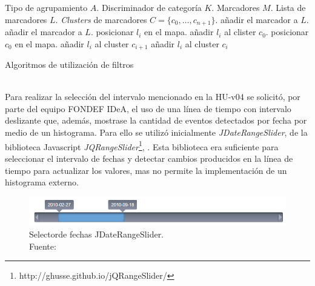 \begin{algorithm}[H]
	\begin{algorithmic}
		\REQUIRE Tipo de agrupamiento $A$.
		\REQUIRE Discriminador de categoría $K$.
		\REQUIRE Marcadores $M$.
		\STATE Lista de marcadores $L$.
		\STATE \textit{Clusters} de marcadores $C = \{c_{0}, \dots, c_{n+1} \}$.
				\STATE añadir el marcador a $L$.
				\STATE añadir el marcador a $L$.
			\ENDIF
		\ENDFOR
				\STATE posicionar $l_{i}$ en el mapa.
			\ENDFOR
				\STATE añadir $l_{i}$ al clister $c_{0}$.
			\ENDFOR
			\STATE posicionar $c_{0}$ en el mapa.
		\ELSE
				\STATE añadir $l_{i}$ al cluster $c_{i+1}$
			\ENDFOR
				\STATE añadir $l_{i}$ al cluster $c_{i}$
			\ENDFOR
		\ENDIF
	\end{algorithmic}
	\caption{Algoritmos de utilización de filtros}
	\label{alg:filtroMarcadores}
\end{algorithm}\vphantom\\

Para realizar la selección del intervalo mencionado en la HU-v04 se solicitó, por parte del equipo FONDEF IDeA, el uso de una línea de tiempo con intervalo deslizante que, además, mostrase la cantidad de eventos detectados por fecha por medio de un histograma. Para ello se utilizó inicialmente \textit{JDateRangeSlider}, de la biblioteca Javascript \textit{JQRangeSlider}\footnote{http://ghusse.github.io/jQRangeSlider/}, \cite{JQRangeSlider}. Esta biblioteca era suficiente para seleccionar el intervalo de fechas y detectar cambios producidos en la línea de tiempo para actualizar los valores, mas no permite la implementación de un histograma externo.

\begin{figure}[H]
	\centering
	\captionsetup{justification=centering}
	\includegraphics[scale=0.6]{images/JDateRangeSlider.png}
	\caption[Selectorde fechas JDateRangeSlider.]{Selectorde fechas JDateRangeSlider.\\Fuente: \cite{JQRangeSlider}}
	\label{fig:JQRangeSlider}
\end{figure}

